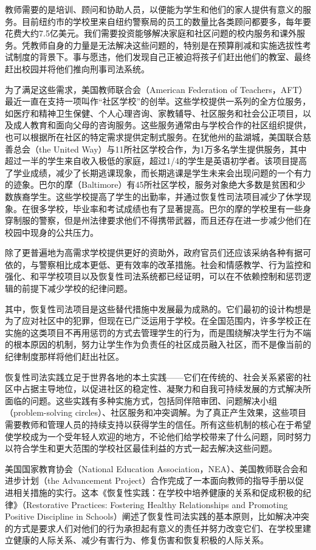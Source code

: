 \documentclass[fontset=fandol, a4paper, 12pt, openright]{ctexbook}
\begin{document}
教师需要的是培训、顾问和协助人员，以便能为学生和他们的家人提供有意义的服务。目前纽约市的学校里来自纽约警察局的员工的数量比各类顾问都要多，每年要花费大约7.5亿美元。我们需要投资能够解决家庭和社区问题的校内服务和课外服务。凭教师自身的力量是无法解决这些问题的，特别是在预算削减和实施选拔性考试制度的背景下。事与愿违，他们发现自己正被迫将孩子们赶出他们的教室、最终赶出校园并将他们推向刑事司法系统。

为了满足这些需求，美国教师联合会（American Federation of Teachers，AFT）最近一直在支持一项叫作“社区学校”的创举。这些学校提供一系列的全方位服务，如医疗和精神卫生保健、个人心理咨询、家教辅导、社区服务和社会公正项目，以及成人教育和面向父母的咨询服务。这些服务通常由与学校合作的社区组织提供，也可以根据所在社区的特定需求提供定制式服务。在犹他州的盐湖城，美国联合慈善总会（the United Way）与11所社区学校合作，为1万多名学生提供服务，其中超过一半的学生来自收入极低的家庭，超过1/4的学生是英语初学者。该项目提高了学业成绩，减少了长期逃课现象，而长期逃课是学生未来会出现问题的一个有力的迹象。巴尔的摩（Baltimore）有45所社区学校，服务对象绝大多数是贫困和少数族裔学生。这些学校提高了学生的出勤率，并通过恢复性司法项目减少了休学现象。在很多学校，毕业率和考试成绩也有了显著提高。巴尔的摩的学校里有一些身穿制服的警察，但是州法律要求他们不得携带武器，而且还存在进一步减少他们在校园中现身的公共压力。

除了更普遍地为高需求学校提供更好的资助外，政府官员们还应该采纳各种有据可依的，与警察相比成本更低、更有效率的改革措施。社会和情感教学、行为监控和强化、和平学校项目以及恢复性司法系统都已经证明，可以在不依赖控制和惩罚逻辑的前提下减少学校的纪律问题。

其中，恢复性司法项目是这些替代措施中发展最为成熟的。它们最初的设计构想是为了应对社区中的犯罪，但现在已广泛运用于学校。在全国范围内，许多学校正在实施的这类项目不再用惩罚的方式去管理学生的行为，而是围绕解决学生行为不端的根本原因的机制，努力让学生作为负责任的社区成员融入社区，而不是像当前的纪律制度那样将他们赶出社区。

恢复性司法实践立足于世界各地的本土实践——它们在传统的、社会关系紧密的社区中占据主导地位，以促进社区的稳定性、凝聚力和自我可持续发展的方式解决所面临的问题。这些实践有多种实施方式，包括同伴陪审团、问题解决小组（problem-solving circles）、社区服务和冲突调解。为了真正产生效果，这些项目需要教师和管理人员的持续支持以获得学生的信任。所有这些机制的核心在于希望使学校成为一个受年轻人欢迎的地方，不论他们给学校带来了什么问题，同时努力以符合学生和更大范围的学校社区最佳利益的方式一起去解决这些问题。

美国国家教育协会（National Education Association，NEA）、美国教师联合会和进步计划（the Advancement Project）合作完成了一本面向教师的指导手册以促进相关措施的实行。这本《恢复性实践：在学校中培养健康的关系和促成积极的纪律》（Restorative Practices: Fostering Healthy Relationships and Promoting Positive Discipline in Schools）阐述了恢复性司法实践的基本原则，比如解决冲突的方式是要求人们对他们的行为承担起有意义的责任并努力改变它们、在学校里建立健康的人际关系、减少有害行为、修复伤害和恢复积极的人际关系。
\end{document}
